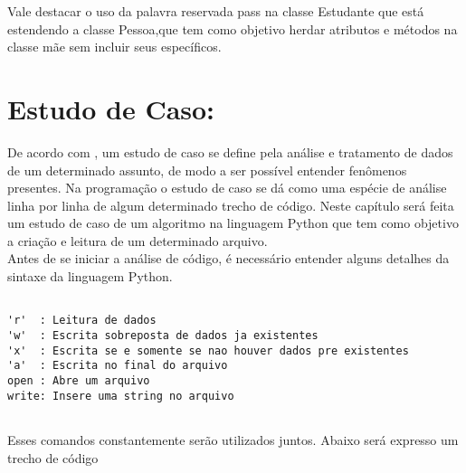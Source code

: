 Vale destacar o uso da palavra reservada pass na classe Estudante que está estendendo a classe Pessoa,que tem como objetivo herdar atributos e métodos na classe mãe sem incluir seus específicos. 
    \section{Estudo de Caso: }
De acordo com \cite{Perkovic2016}, um estudo de caso se define pela análise e tratamento de dados de um determinado assunto, de modo a ser possível entender fenômenos presentes. Na programação o estudo de caso se dá como uma espécie de análise linha por linha de algum determinado trecho de código. Neste capítulo será feita um estudo de caso de um algoritmo na linguagem Python que tem como objetivo a criação e leitura de um determinado arquivo.\\
Antes de se iniciar a análise de código, é necessário entender alguns detalhes da sintaxe da linguagem Python.
\begin{lstlisting}
 	
'r'  : Leitura de dados
'w'  : Escrita sobreposta de dados ja existentes
'x'  : Escrita se e somente se nao houver dados pre existentes
'a'  : Escrita no final do arquivo
open : Abre um arquivo
write: Insere uma string no arquivo
	
\end{lstlisting}
Esses comandos constantemente serão utilizados juntos. Abaixo será expresso um trecho de código 